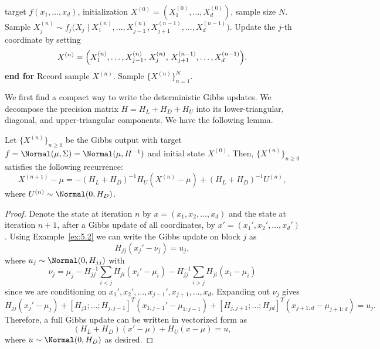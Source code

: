 \begin{algorithm}[H]
\caption{Deterministic Update Gibbs Sampler (DUGS)}
\label{alg:5.2}
\begin{algorithmic}[1]
\Require target $f(x_1, \ldots, x_d)$, initialization
  $X^{(0)} = (X_1^{(0)}, \ldots, X_d^{(0)})$, sample size $N$.
    \State Sample $X_j^{(n)} \sim f_j\!\bigl(X_j \mid X_1^{(n)}, \ldots, X_{j-1}^{(n)},
      X_{j+1}^{(n-1)}, \ldots, X_d^{(n-1)}\bigr)$.
    \State Update the $j$-th coordinate by setting
      \[
        X^{(n)} = \Bigl(X_1^{(n)}, \ldots, X_{j-1}^{(n)},\, X_j^{(n)},\,
          X_{j+1}^{(n-1)}, \ldots, X_d^{(n-1)}\Bigr).
      \]
  \EndFor
  \State \textbf{end for}
  \State Record sample $X^{(n)}$.
\EndFor
\Ensure Sample $\{X^{(n)}\}_{n=1}^N$.
\end{algorithmic}
\end{algorithm}

We first find a compact way to write the deterministic Gibbs updates. We decompose the precision
matrix $H = H_L + H_D + H_U$ into its lower-triangular, diagonal, and upper-triangular
components. We have the following lemma.

\begin{lemma}
\label{lem:5.11}
Let $\{X^{(n)}\}_{n \ge 0}$ be the Gibbs output with target $f = \Normal(\mu, \Sigma) =
\Normal(\mu, H^{-1})$ and initial state $X^{(0)}$. Then, $\{X^{(n)}\}_{n \ge 0}$ satisfies
the following recurrence:
\begin{equation}
  X^{(n+1)} - \mu = -(H_L + H_D)^{-1} H_U (X^{(n)} - \mu) + (H_L + H_D)^{-1} U^{(n)},
  \label{eq:5.3}
\end{equation}
where $U^{(n)} \sim \Normal(0, H_D)$.
\end{lemma}

\begin{proof}
Denote the state at iteration $n$ by $x = (x_1, x_2, \ldots, x_d)$ and the state at iteration
$n+1$, after a Gibbs update of all coordinates, by $x' = (x_1', x_2', \ldots, x_d')$. Using
Example~\ref{ex:5.2} we can write the Gibbs update on block $j$ as
\[
  H_{jj}(x_j' - \nu_j) = u_j,
\]
where $u_j \sim \Normal(0, H_{jj})$ with
\[
  \nu_j = \mu_j - H_{jj}^{-1}\sum_{i < j} H_{ji}(x_i' - \mu_i)
    - H_{jj}^{-1}\sum_{i > j} H_{ji}(x_i - \mu_i)
\]
since we are conditioning on $x_1', x_2', \ldots, x_{j-1}', x_{j+1}, \ldots, x_d$.
Expanding out $\nu_j$ gives
\[
  H_{jj}(x_j' - \mu_j)
    + [H_{j1};\ldots;H_{j,j-1}]^T(x_{1:j-1}' - \mu_{1:j-1})
    + [H_{j,j+1};\ldots;H_{jd}]^T(x_{j+1:d} - \mu_{j+1:d})
  = u_j.
\]
Therefore, a full Gibbs update can be written in vectorized form as
\[
  (H_L + H_D)(x' - \mu) + H_U(x - \mu) = u,
\]
where $u \sim \Normal(0, H_D)$ as desired.
\end{proof}

